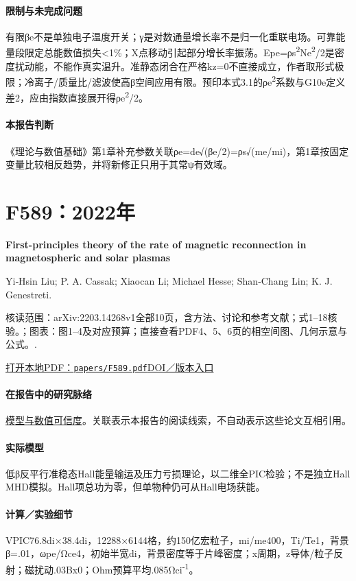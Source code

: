\documentclass[UTF8,a4paper,11pt,openany,fontset=fandol]{ctexbook}
\begin{document}
\paragraph{限制与未完成问题}有限βe不是单独电子温度开关；γ是对数通量增长率不是归一化重联电场。可靠能量段限定总能数值损失<1\%；X点移动引起部分增长率振荡。Epe=ρs\textsuperscript{2}Ne\textsuperscript{2}/2是密度扰动能，不能作真实温升。准静态闭合在严格kz=0不直接成立，作者取形式极限；冷离子/质量比/滤波使高β空间应用有限。预印本式3.1的ρe\textsuperscript{2}系数与G10e定义差2，应由指数直接展开得ρe\textsuperscript{2}/2。

\paragraph{本报告判断}《理论与数值基础》第1章补充参数关联ρe=de√(βe/2)=ρs√(me/mi)，第1章按固定变量比较相反趋势，并将新修正只用于其常ψ有效域。

\section{F589：2022年}\label{paper:F589}

\textbf{First-principles theory of the rate of magnetic reconnection in magnetospheric and solar plasmas}\citep{F589}\

Yi‐Hsin Liu;  P. A. Cassak;  Xiaocan Li;  Michael Hesse;  Shan‐Chang Lin;  K. J. Genestreti.

\textsf{核读范围：}arXiv:2203.14268v1全部10页，含方法、讨论和参考文献；式1–18核验。；\textsf{图表：}图1–4及对应预算；直接查看PDF4、5、6页的相空间图、几何示意与公式。.

\href{run:../papers/F589.pdf}{打开本地PDF：\texttt{papers/F589.pdf}}\quad\href{https://doi.org/10.1038/s42005-022-00854-x}{DOI／版本入口}

\paragraph{在报告中的研究脉络}\hyperref[V1-ch:numerics]{模型与数值可信度}。关联表示本报告的阅读线索，不自动表示这些论文互相引用。

\paragraph{实际模型}低β反平行准稳态Hall能量输运及压力亏损理论，以二维全PIC检验；不是独立Hall MHD模拟。Hall项总功为零，但单物种仍可从Hall电场获能。

\paragraph{计算／实验细节}VPIC76.8di×38.4di，12288×6144格，约150亿宏粒子，mi/me400，Ti/Te1，背景β=.01，ωpe/Ωce4，初始半宽di，背景密度等于片峰密度；x周期，z导体/粒子反射；磁扰动.03Bx0；Ohm预算平均.085Ωci\textsuperscript{-1}。
\end{document}
